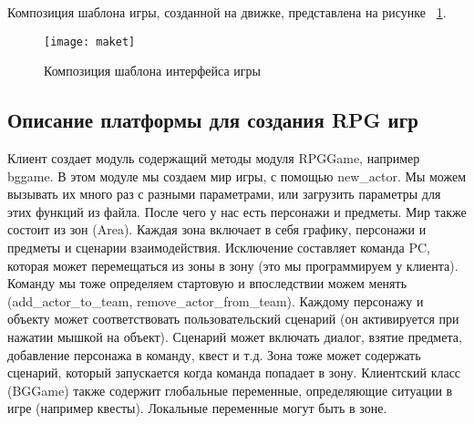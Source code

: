 Композиция шаблона игры, созданной на движке, представлена на рисунке ~\ref{maket:image}.

\begin{figure}[ht]
	\texttt{[image: maket]}
	\caption{Композиция шаблона интерфейса игры}
	\label{maket:image}
\end{figure}

\subsection{Описание платформы для создания RPG игр}
Клиент создает модуль содержащий методы модуля RPGGame, например bggame. В этом модуле мы создаем мир игры, с помощью new\_actor. Мы можем вызывать их много раз с разными параметрами, или загрузить параметры для этих функций из файла. После чего у нас есть персонажи и предметы. Мир также состоит из зон (Area). Каждая зона включает в себя графику, персонажи и предметы и сценарии взаимодействия. Исключение составляет команда PC, которая может перемещаться из зоны в зону (это мы программируем у клиента). Команду мы тоже определяем стартовую и впоследствии можем менять (add\_actor\_to\_team, remove\_actor\_from\_team). Каждому персонажу и объекту может соответствовать пользовательский сценарий (он активируется при нажатии мышкой на объект). Сценарий может включать диалог, взятие предмета, добавление персонажа в команду, квест и т.д.
Зона тоже может содержать сценарий, который запускается когда команда попадает в зону.
Клиентский класс (BGGame) также содержит глобальные переменные, определяющие ситуации в игре (например квесты). Локальные переменные могут быть в зоне.

